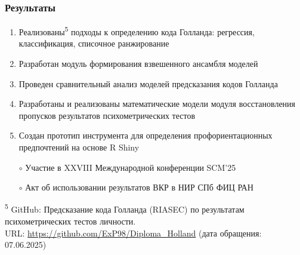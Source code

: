 \documentclass
  [ russian
  , aspectratio=169 %
  ] {beamer}
\begin{document}
\begin{frame}
    \frametitle{Результаты}
    \begin{enumerate}
        \item Реализованы\textsuperscript{5} подходы к определению кода Голланда: регрессия, классификация, списочное ранжирование
        \item Разработан модуль формирования взвешенного ансамбля моделей
        \item Проведен сравнительный анализ моделей предсказания кодов Голланда
        \item Разработаны и реализованы математические модели модуля восстановления пропусков результатов психометрических тестов
        \item Создан прототип инструмента для определения профориентационных предпочтений на основе R Shiny
        \vspace{0.8em}
        \item[$\circ$] Участие в XXVIII Международной конференции SCM'25
        \item[$\circ$] Акт об использовании результатов ВКР в НИР СПб ФИЦ РАН
    \end{enumerate}

    \btVFill
    {\footnotesize
        \textsuperscript{5} GitHub: Предсказание кода Голланда (RIASEC) по результатам психометрических тестов личности.\\\quad URL: \url{https://github.com/ExP98/Diploma_Holland} (дата обращения: 07.06.2025)\\
    }
\end{frame}


\appendix
\end{document}
